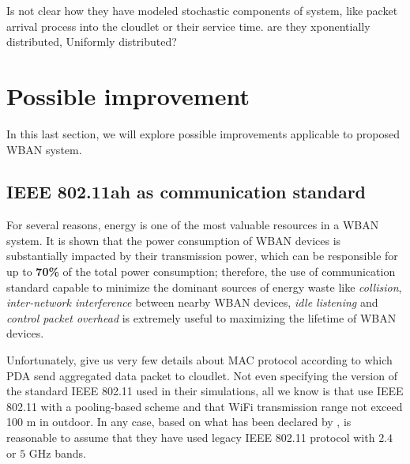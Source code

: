 \documentclass[sigchi]{acmart}
\begin{document}
Is not clear how they have modeled stochastic components of system, like packet arrival process into the cloudlet or their service time.
are they xponentially distributed, Uniformly distributed?





























\section{Possible improvement}

In this last section, we will explore possible improvements applicable to \citep{MSAReport} proposed WBAN system.

\subsection{IEEE 802.11ah as communication standard}

For several reasons, energy is one of the most valuable resources in a WBAN system. It is shown that the power consumption of WBAN devices is substantially impacted by their transmission power, which can be responsible for up to \textbf{70\%} of the total power consumption; therefore, the use of communication standard capable to minimize the dominant sources of energy waste like \textit{collision}, \textit{inter-network interference} between nearby WBAN devices, \textit{idle listening} and \textit{control packet overhead} is extremely useful to maximizing the lifetime of WBAN devices.

Unfortunately, \citet{MSAReport} give us very few details about MAC protocol according to which PDA send aggregated data packet to cloudlet. Not even specifying the version of the standard IEEE 802.11 used in their simulations, all we know is that \citep{MSAReport} use IEEE 802.11 with a pooling-based scheme and that WiFi transmission range not exceed 100 m in outdoor. In any case, based on what has been declared by \citep{MSAReport}, is reasonable to assume that they have used legacy IEEE 802.11 protocol with $2.4$ or $5$ GHz bands.
\end{document}

